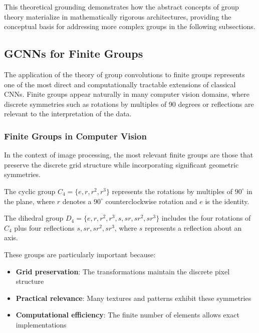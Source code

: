 This theoretical grounding demonstrates how the abstract concepts of group theory materialize in mathematically rigorous architectures, providing the conceptual basis for addressing more complex groups in the following subsections.

\subsection[GCNNs for Finite Groups]{\glspl{GCNN} for Finite Groups}\label{subsec:gcnns_grupos_finitos}

The application of the theory of group convolutions to finite groups represents one of the most direct and computationally tractable extensions of classical \glspl{CNN}. Finite groups appear naturally in many computer vision domains, where discrete symmetries such as rotations by multiples of 90 degrees or reflections are relevant to the interpretation of the data.

\subsubsection{Finite Groups in Computer Vision}

In the context of image processing, the most relevant finite groups are those that preserve the discrete grid structure while incorporating significant geometric symmetries.

\begin{definition}
The cyclic group $C_4 = \{e, r, r^2, r^3\}$ represents the rotations by multiples of $90^\circ$ in the plane, where $r$ denotes a $90^\circ$ counterclockwise rotation and $e$ is the identity.
\end{definition}

\begin{definition}
The dihedral group $D_4 = \{e, r, r^2, r^3, s, sr, sr^2, sr^3\}$ includes the four rotations of $C_4$ plus four reflections $s, sr, sr^2, sr^3$, where $s$ represents a reflection about an axis.
\end{definition}

These groups are particularly important because:
\begin{itemize}
    \item \textbf{Grid preservation}: The transformations maintain the discrete pixel structure
    \item \textbf{Practical relevance}: Many textures and patterns exhibit these symmetries
    \item \textbf{Computational efficiency}: The finite number of elements allows exact implementations
\end{itemize}

